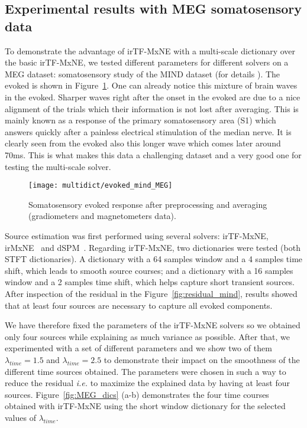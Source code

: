 \subsection{Experimental results with MEG somatosensory data}
To demonstrate the advantage of irTF-MxNE with a multi-scale dictionary over the basic irTF-MxNE, we tested different parameters for different solvers on a MEG dataset: somatosensory study of the MIND dataset (for details \cite{weisend2007paving}). The evoked is shown in Figure~\ref{fig:evoked_mind}. One can already notice this mixture of brain waves in the evoked. Sharper waves right after the onset in the evoked are due to a nice alignment of the trials which their information is not lost after averaging. This is mainly known as a response of the primary somatosensory area (S1) which answers quickly after a painless electrical stimulation of the median nerve. It is clearly seen from the evoked also this longer wave which comes later around 70ms. This is what makes this data a challenging dataset and a very good one for testing the multi-scale solver.

\begin{figure}
\centering
	\texttt{[image: multidict/evoked\_mind\_MEG]}
    \caption{Somatosensory evoked response after preprocessing and averaging (gradiometers and magnetometers data).}
    \label{fig:evoked_mind}
\end{figure}

Source estimation was first performed using several solvers: irTF-MxNE, irMxNE~\cite{strohmeier2014iterative} and dSPM~\cite{dale2000dynamic}. Regarding irTF-MxNE, two dictionaries were tested (both STFT dictionaries). A dictionary with a 64 samples window and a 4 samples time shift, which leads to smooth source courses; and a dictionary with a 16 samples window and a 2 samples time shift, which helps capture short transient sources. After inspection of the residual in the Figure~\ref{fig:residual_mind}, results showed that at least four sources are necessary to capture all evoked components. 

We have therefore fixed the parameters of the irTF-MxNE solvers so we obtained only four sources while explaining as much variance as possible. After that, we experimented with a set of different parameters and we show two of them $\lambda_{time}=1.5$ and $\lambda_{time}=2.5$ to demonstrate their impact on the smoothness of the different time sources obtained.
The parameters were chosen in such a way to reduce the residual \textit{i.e.} to maximize the explained data by having at least four sources. 
Figure~\ref{fig:MEG_dics} (a-b) demonstrates the four time courses obtained with irTF-MxNE using the short window dictionary for the selected values of $\lambda_{time}$.

